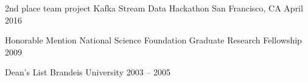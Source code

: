 



\begin{cvhonors}

  \cvhonor
    {2nd place team project} %
    {Kafka Stream Data Hackathon} %
    {San Francisco, CA} %
    {April 2016} %

  \cvhonor
    {Honorable Mention} %
    {National Science Foundation Graduate Research Fellowship} %
    {} %
    {2009} %

  \cvhonor
    {Dean's List} %
    {Brandeis University} %
    {} %
    {2003 -- 2005} %

\end{cvhonors}








